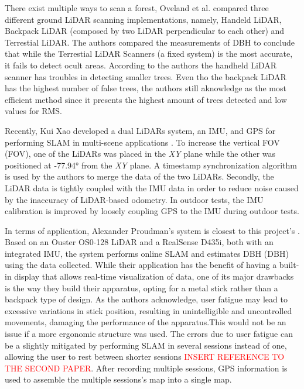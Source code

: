 There exist multiple ways to scan a forest, Oveland et al. \cite{oveland_comparing_2018} compared three different ground LiDAR scanning implementations, namely, Handeld LiDAR, Backpack LiDAR (composed by two \acs*{LiDAR} perpendicular to each other) and Terrestial LiDAR. The authors compared the measurements of \acs*{DBH} to conclude that while the Terrestial LiDAR Scanners (a fixed system) is the most accurate, it fails to detect ocult areas. According to the authors the handheld LiDAR scanner has troubles in detecting smaller trees. Even tho the backpack LiDAR has the highest number of false trees, the authors still aknowledge as the most efficient method since it presents the highest amount of trees detected and low values for \acs*{RMS}.


Recently, Kui Xao developed a dual \acs*{LiDAR}s system, an \acs*{IMU}, and \acs*{GPS} for performing \acs*{SLAM} in multi-scene applications \cite{xiao_high-precision_2022}. To increase the vertical \acl*{FOV} (\acs*{FOV}), one of the \acs*{LiDAR}s was placed in the \textit{XY} plane while the other was positioned at -77.94° from the \textit{XY} plane. A timestamp synchronization algorithm is used by the authors to merge the data of the two \acs*{LiDAR}s. Secondly, the \acs*{LiDAR} data is tightly coupled with the IMU data in order to reduce noise caused by the inaccuracy of \acs*{LiDAR}-based odometry. In outdoor tests, the \acs*{IMU} calibration is improved by loosely coupling \acs*{GPS} to the \acs*{IMU} during outdoor tests.

In terms of application, Alexander Proudman's system is closest to this project's \cite{proudman_online_2021}. Based on an Ouster OS0-128 \acs{LiDAR} and a RealSense D435i, both with an integrated \acs{IMU}, the system performs online \acs{SLAM} and estimates \acl{DBH} (\acs*{DBH}) using the data collected. While their application has the benefit of having a built-in display that allows real-time visualization of data, one of its major drawbacks is the way they build their apparatus, opting for a metal stick rather than a backpack type of design. As the authors acknowledge, user fatigue may lead to excessive variations in stick position, resulting in unintelligible and uncontrolled movements, damaging the performance of the apparatus.This would not be an issue if a more ergonomic structure was used. The errors due to user fatigue can be a slightly mitigated by performing \acs{SLAM} in several sessions instead of one, allowing the user to rest between shorter sessions \textcolor{red}{INSERT REFERENCE TO THE SECOND PAPER}. After recording multiple sessions, \acs*{GPS} information is used to assemble the multiple sessions's map into a single map.
